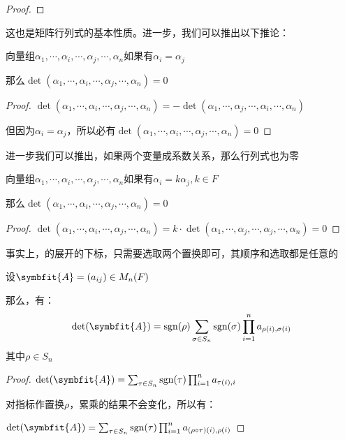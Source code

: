 \documentclass[12pt, a4paper, oneside, UTF8]{ctexbook}
\begin{document}
\begin{para}{0}
\begin{proof}
					\end{proof}
					这也是矩阵行列式的基本性质。进一步，我们可以推出以下推论：
					\begin{corollary}{}
					向量组$\alpha_1,\cdots,\alpha_i,\cdots,\alpha_j,\cdots,\alpha_n$如果有$\alpha_i=\alpha_j$

					那么$\det (\alpha_1,\cdots,\alpha_i,\cdots,\alpha_j,\cdots,\alpha_n)=0$
					\end{corollary}
					\begin{proof}
						$\det (\alpha_1,\cdots,\alpha_i,\cdots,\alpha_j,\cdots,\alpha_n)=-\det (\alpha_1,\cdots,\alpha_j,\cdots,\alpha_i,\cdots,\alpha_n)$

						但因为$\alpha_i=\alpha_j$，所以必有$\det (\alpha_1,\cdots,\alpha_i,\cdots,\alpha_j,\cdots,\alpha_n)=0$
					\end{proof}
					进一步我们可以推出，如果两个变量成系数关系，那么行列式也为零
					\begin{corollary}{}
						向量组$\alpha_1,\cdots,\alpha_i,\cdots,\alpha_j,\cdots,\alpha_n$如果有$\alpha_i=k\alpha_j,k\in F$

						那么$\det (\alpha_1,\cdots,\alpha_i,\cdots,\alpha_j,\cdots,\alpha_n)=0$
					\end{corollary}
					\begin{proof}
						$\det (\alpha_1,\cdots,\alpha_i,\cdots,\alpha_j,\cdots,\alpha_n)=k\cdot \det (\alpha_1,\cdots,\alpha_j,\cdots,\alpha_j,\cdots,\alpha_n)=0$
					\end{proof}
					
					事实上，的展开的下标，只需要选取两个置换即可，其顺序和选取都是任意的
					\begin{corollary}{}{}
						设$\symbfit{A}=(a_{ij})\in M_n(F)$

						那么，有：
						\begin{equation}
							\det(\symbfit{A})=\text{sgn}(\rho )\sum_{\sigma \in S_n} \text{sgn}(\sigma) \prod_{i=1}^n a_{\rho(i),\sigma(i)}
						\end{equation}
						其中$\rho \in S_n$
					\end{corollary}
					\begin{proof}
						$\det(\symbfit{A})=\sum_{\tau  \in S_n} \text{sgn}(\tau ) \prod_{i=1}^n a_{\tau (i),i}$

						对指标作置换$\rho $，累乘的结果不会变化，所以有：

						$\det(\symbfit{A})=\sum_{\tau \in S_n} \text{sgn}(\tau ) \prod_{i=1}^n a_{(\rho \circ \tau )(i),\rho (i)}$


\end{proof}
\end{para}
\end{document}

